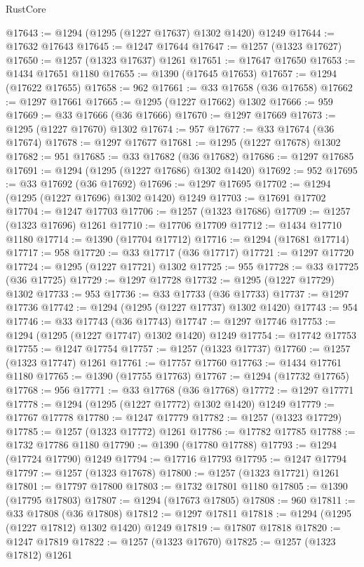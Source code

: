 \begin{lexlean}{RustCore}
\begin{coremodule}
@17643 := @1294 (@1295 (@1227 @17637) @1302 @1420) @1249
@17644 := @17632 @17643
@17645 := @1247 @17644
@17647 := @1257 (@1323 @17627)
@17650 := @1257 (@1323 @17637) @1261
@17651 := @17647 @17650
@17653 := @1434 @17651 @1180
@17655 := @1390 (@17645 @17653)
@17657 := @1294 (@17622 @17655)
@17658 := 962
@17661 := @33 @17658 (@36 @17658)
@17662 := @1297 @17661
@17665 := @1295 (@1227 @17662) @1302
@17666 := 959
@17669 := @33 @17666 (@36 @17666)
@17670 := @1297 @17669
@17673 := @1295 (@1227 @17670) @1302
@17674 := 957
@17677 := @33 @17674 (@36 @17674)
@17678 := @1297 @17677
@17681 := @1295 (@1227 @17678) @1302
@17682 := 951
@17685 := @33 @17682 (@36 @17682)
@17686 := @1297 @17685
@17691 := @1294 (@1295 (@1227 @17686) @1302 @1420)
@17692 := 952
@17695 := @33 @17692 (@36 @17692)
@17696 := @1297 @17695
@17702 := @1294 (@1295 (@1227 @17696) @1302 @1420) @1249
@17703 := @17691 @17702
@17704 := @1247 @17703
@17706 := @1257 (@1323 @17686)
@17709 := @1257 (@1323 @17696) @1261
@17710 := @17706 @17709
@17712 := @1434 @17710 @1180
@17714 := @1390 (@17704 @17712)
@17716 := @1294 (@17681 @17714)
@17717 := 958
@17720 := @33 @17717 (@36 @17717)
@17721 := @1297 @17720
@17724 := @1295 (@1227 @17721) @1302
@17725 := 955
@17728 := @33 @17725 (@36 @17725)
@17729 := @1297 @17728
@17732 := @1295 (@1227 @17729) @1302
@17733 := 953
@17736 := @33 @17733 (@36 @17733)
@17737 := @1297 @17736
@17742 := @1294 (@1295 (@1227 @17737) @1302 @1420)
@17743 := 954
@17746 := @33 @17743 (@36 @17743)
@17747 := @1297 @17746
@17753 := @1294 (@1295 (@1227 @17747) @1302 @1420) @1249
@17754 := @17742 @17753
@17755 := @1247 @17754
@17757 := @1257 (@1323 @17737)
@17760 := @1257 (@1323 @17747) @1261
@17761 := @17757 @17760
@17763 := @1434 @17761 @1180
@17765 := @1390 (@17755 @17763)
@17767 := @1294 (@17732 @17765)
@17768 := 956
@17771 := @33 @17768 (@36 @17768)
@17772 := @1297 @17771
@17778 := @1294 (@1295 (@1227 @17772) @1302 @1420) @1249
@17779 := @17767 @17778
@17780 := @1247 @17779
@17782 := @1257 (@1323 @17729)
@17785 := @1257 (@1323 @17772) @1261
@17786 := @17782 @17785
@17788 := @1732 @17786 @1180
@17790 := @1390 (@17780 @17788)
@17793 := @1294 (@17724 @17790) @1249
@17794 := @17716 @17793
@17795 := @1247 @17794
@17797 := @1257 (@1323 @17678)
@17800 := @1257 (@1323 @17721) @1261
@17801 := @17797 @17800
@17803 := @1732 @17801 @1180
@17805 := @1390 (@17795 @17803)
@17807 := @1294 (@17673 @17805)
@17808 := 960
@17811 := @33 @17808 (@36 @17808)
@17812 := @1297 @17811
@17818 := @1294 (@1295 (@1227 @17812) @1302 @1420) @1249
@17819 := @17807 @17818
@17820 := @1247 @17819
@17822 := @1257 (@1323 @17670)
@17825 := @1257 (@1323 @17812) @1261

\end{coremodule}
\end{lexlean}
